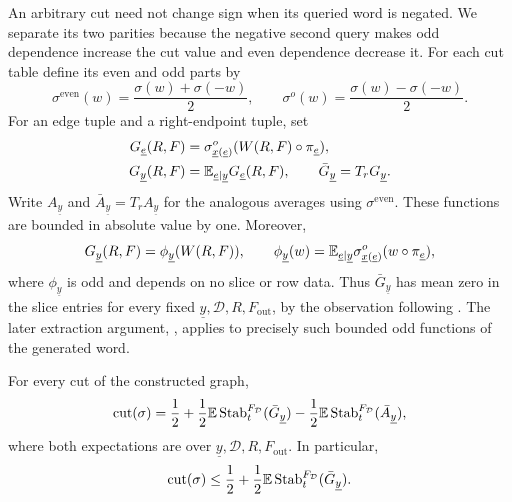An arbitrary cut need not change sign when its queried word is negated.
We separate its two parities because the negative second query makes
odd dependence increase the cut value and even dependence decrease it.
For each cut table define its even and odd parts by
\[
 \sigma^{\mathrm{even}}(w)=\frac{\sigma(w)+\sigma(-w)}2,
 \qquad
 \sigma^o(w)=\frac{\sigma(w)-\sigma(-w)}2.
\]
For an edge tuple and a right-endpoint tuple, set
\begin{align}
 G_{\underline e}(R,F)
 &=\sigma^o_{\underline x(\underline e)}
       (W(R,F)\circ\pi_{\underline e}),\label{eq:edge-function}\\
 G_{\underline y}(R,F)
 &=\mathbb E_{\underline e\mid\underline y}G_{\underline e}(R,F),
 \qquad \bar G_{\underline y}=T_rG_{\underline y}.
 \label{eq:average-function}
\end{align}
Write $A_{\underline y}$ and $\bar A_{\underline y}=T_rA_{\underline y}$
for the analogous averages using $\sigma^{\mathrm{even}}$.
These functions are bounded in absolute value by one.
Moreover,
\[
 G_{\underline y}(R,F)=\phi_{\underline y}(W(R,F)),\qquad
 \phi_{\underline y}(w)=\mathbb E_{\underline e\mid\underline y}
 \sigma^o_{\underline x(\underline e)}(w\circ\pi_{\underline e}),
\]
where $\phi_{\underline y}$ is odd and depends on no slice or row data.
Thus $\bar G_{\underline y}$ has mean zero in the slice entries for
every fixed $\underline y,\mathcal D,R,F_{\mathrm{out}}$, by the
observation following .
The later extraction argument, , applies to precisely
such bounded odd functions of the generated word.

\begin{lemma}\label{lem:cut-stability}
For every cut of the constructed graph,
\begin{equation}\label{eq:cut-stability}
 \operatorname{cut}(\sigma)=\frac12+
 \frac12\mathbb E\operatorname{Stab}_t^{F_{\mathcal D}}(\bar G_{\underline y})
 -\frac12\mathbb E\operatorname{Stab}_t^{F_{\mathcal D}}(\bar A_{\underline y}),
\end{equation}
where both expectations are over
$\underline y,\mathcal D,R,F_{\mathrm{out}}$.
In particular,
\begin{equation}\label{eq:cut-upper-stability}
 \operatorname{cut}(\sigma)\le\frac12+
 \frac12\mathbb E\operatorname{Stab}_t^{F_{\mathcal D}}(\bar G_{\underline y}).
\end{equation}
\end{lemma}

